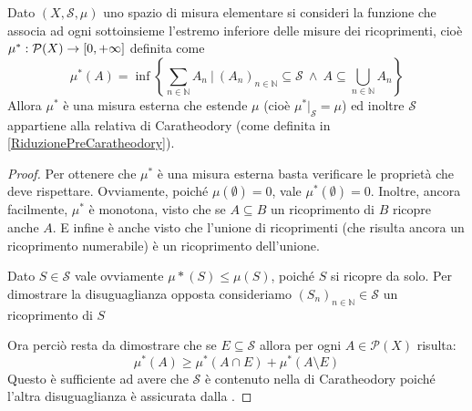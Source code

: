 \begin{proposition}\label{MisuraEsternaDiPremisura}
	Dato $(X,\mathcal S,\mu)$ uno spazio di misura elementare si consideri la funzione che associa ad ogni sottoinsieme l'estremo inferiore delle misure dei ricoprimenti, cioè $\mu^*:\mathcal P(X)\to[0,+\infty]$ definita come 
	\begin{equation*}
		\mu^*(A)=\inf\left\{\sum_{n\in\mathbb N} A_n\ |\ (A_n)_{n\in\mathbb N}\subseteq\mathcal S\ \wedge
		\ A\subseteq\bigcup_{n\in\mathbb N}A_n\right\}
	\end{equation*}
	Allora $\mu^*$ è una misura esterna che estende $\mu$ (cioè $\mu^*|_{\mathcal S}=\mu$) ed inoltre $\mathcal S$ appartiene alla relativa \sigalg{} di Caratheodory (come definita in \cref{RiduzionePreCaratheodory}).
\end{proposition}
\begin{proof}
	Per ottenere che $\mu^*$ è una misura esterna basta verificare le proprietà che deve rispettare.
	Ovviamente, poiché $\mu(\emptyset)=0$, vale $\mu^*(\emptyset)=0$. 
	Inoltre, ancora facilmente, $\mu^*$ è monotona, visto che se $A\subseteq B$ un ricoprimento di $B$ ricopre anche $A$.
	E infine è anche \sigsubadd{} visto che l'unione di ricoprimenti (che risulta ancora un ricoprimento numerabile) è un ricoprimento dell'unione.
	
	Dato $S\in\mathcal S$ vale ovviamente $\mu*(S)\le\mu(S)$, poiché $S$ si ricopre da solo. Per dimostrare la disuguaglianza opposta consideriamo $(S_n)_{n\in\mathbb N}\in \mathcal S$ un ricoprimento di $S$
	
	Ora perciò resta da dimostrare che se $E\subseteq \mathcal S$ allora per ogni $A\in\mathcal P(X)$ risulta:
	\begin{equation}\label{MisuraEsternaDisDifficile}
		\mu^*(A) \ge \mu^*(A\cap E)+\mu^*(A\setminus E)
	\end{equation}
	Questo è sufficiente ad avere che $\mathcal S$ è contenuto nella \sigalg{} di Caratheodory poiché l'altra disuguaglianza è assicurata dalla \sigsubadd[ità].
	

\end{proof}
